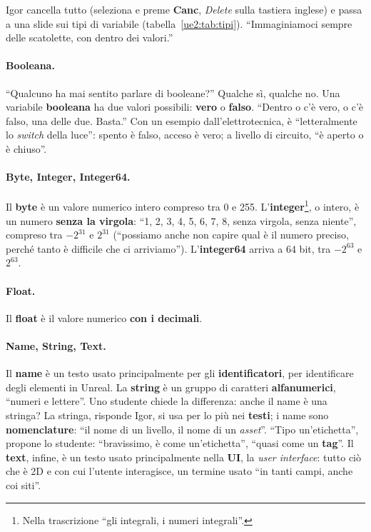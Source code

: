 Igor cancella tutto (seleziona e preme \textbf{Canc}, \emph{Delete} sulla tastiera
inglese) e passa a una slide sui tipi di variabile (tabella~\ref{ue2:tab:tipi}).
``Immaginiamoci sempre delle scatolette, con dentro dei valori.''

\paragraph{Booleana.} ``Qualcuno ha mai sentito parlare di booleane?'' Qualche sì,
qualche no. Una variabile \textbf{booleana} ha due valori possibili: \textbf{vero} o
\textbf{falso}. ``Dentro o c'è vero, o c'è falso, una delle due. Basta.'' Con un esempio
dall'elettrotecnica, è ``letteralmente lo \emph{switch} della luce'': spento è falso,
acceso è vero; a livello di circuito, ``è aperto o è chiuso''.

\paragraph{Byte, Integer, Integer64.} Il \textbf{byte} è un valore numerico intero
compreso tra 0 e 255. L'\textbf{integer}\footnote{Nella trascrizione ``gli integrali, i
numeri integrali''.}, o intero, è un numero \textbf{senza la virgola}: ``1, 2, 3, 4, 5,
6, 7, 8, senza virgola, senza niente'', compreso tra $-2^{31}$ e $2^{31}$ (``possiamo
anche non capire qual è il numero preciso, perché tanto è difficile che ci arriviamo'').
L'\textbf{integer64} arriva a 64 bit, tra $-2^{63}$ e $2^{63}$.

\paragraph{Float.} Il \textbf{float} è il valore numerico \textbf{con i decimali}.

\paragraph{Name, String, Text.} Il \textbf{name} è un testo usato principalmente per gli
\textbf{identificatori}, per identificare degli elementi in Unreal. La \textbf{string}
è un gruppo di caratteri \textbf{alfanumerici}, ``numeri e lettere''. Uno studente chiede
la differenza: anche il name è una stringa? La stringa, risponde Igor, si usa per lo più
nei \textbf{testi}; i name sono \textbf{nomenclature}: ``il nome di un livello, il nome
di un \emph{asset}''. ``Tipo un'etichetta'', propone lo studente: ``bravissimo, è come
un'etichetta'', ``quasi come un \textbf{tag}''. Il \textbf{text}, infine, è un testo
usato principalmente nella \textbf{UI}, la \emph{user interface}: tutto ciò che è 2D e
con cui l'utente interagisce, un termine usato ``in tanti campi, anche coi siti''.

